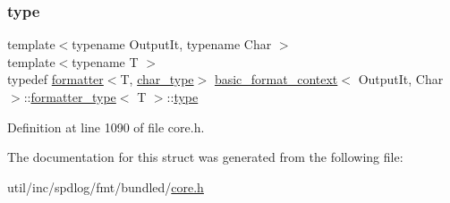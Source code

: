 \subsubsection{\texorpdfstring{type}{type}}
{\footnotesize\ttfamily template$<$typename Output\+It, typename Char $>$ \\
template$<$typename T $>$ \\
typedef \hyperlink{structformatter}{formatter}$<$T, \hyperlink{classbasic__format__context_ab6b3447e996c0b8117e4f6d98d4e1597}{char\+\_\+type}$>$ \hyperlink{classbasic__format__context}{basic\+\_\+format\+\_\+context}$<$ Output\+It, Char $>$\+::\hyperlink{structbasic__format__context_1_1formatter__type}{formatter\+\_\+type}$<$ T $>$\+::\hyperlink{structbasic__format__context_1_1formatter__type_a0d7d26df97530fd48ac910bab66b77d0}{type}}



Definition at line 1090 of file core.\+h.



The documentation for this struct was generated from the following file\+:\begin{DoxyCompactItemize}
\item 
util/inc/spdlog/fmt/bundled/\hyperlink{core_8h}{core.\+h}\end{DoxyCompactItemize}
